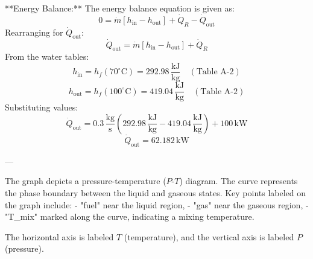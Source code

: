 **Energy Balance:**  
The energy balance equation is given as:  
\[
0 = \dot{m} \left[ h_{\text{in}} - h_{\text{out}} \right] + \dot{Q}_R - \dot{Q}_{\text{out}}
\]  
Rearranging for \(\dot{Q}_{\text{out}}\):  
\[
\dot{Q}_{\text{out}} = \dot{m} \left[ h_{\text{in}} - h_{\text{out}} \right] + \dot{Q}_R
\]  
From the water tables:  
\[
h_{\text{in}} = h_f(70^\circ\text{C}) = 292.98 \, \frac{\text{kJ}}{\text{kg}} \quad (\text{Table A-2})
\]  
\[
h_{\text{out}} = h_f(100^\circ\text{C}) = 419.04 \, \frac{\text{kJ}}{\text{kg}} \quad (\text{Table A-2})
\]  
Substituting values:  
\[
\dot{Q}_{\text{out}} = 0.3 \, \frac{\text{kg}}{\text{s}} \left( 292.98 \, \frac{\text{kJ}}{\text{kg}} - 419.04 \, \frac{\text{kJ}}{\text{kg}} \right) + 100 \, \text{kW}
\]  
\[
\dot{Q}_{\text{out}} = 62.182 \, \text{kW}
\]  

---

The graph depicts a pressure-temperature (\(P\)-\(T\)) diagram. The curve represents the phase boundary between the liquid and gaseous states. Key points labeled on the graph include:  
- "fuel" near the liquid region,  
- "gas" near the gaseous region,  
- "T_{mix}" marked along the curve, indicating a mixing temperature.  

The horizontal axis is labeled \(T\) (temperature), and the vertical axis is labeled \(P\) (pressure).